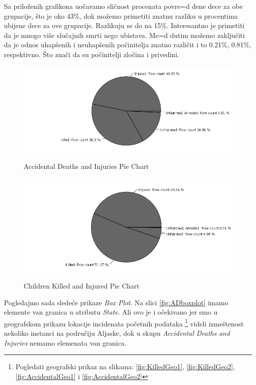 \documentclass[12pt, a4paper]{article}
\def\dj{\leavevmode\setbox0=\hbox{d}\kern0pt
\rlap{\kern.215em\raise.46\ht0\hbox{-}}d}
\begin{document}
\newpage
Sa prilo\v zenih grafikona uo\v cavamo sli\v cnost procenata povre\dj ene dece za obe grupacije, \v sto je oko 43\%, dok mo\v zemo primetiti znatnu razliku u procentima ubijene dece za ove grupacije. Razlikuju se do na 15\%. Interesantno je primetiti da je mnogo vi\v se slu\v cajnih smrti nego ubistava.
Me\dj utim mo\v zemo zaklju\v citi da je odnos uhap\v senih i neuhap\v senih po\v cinitelja znatno razli\v cit i to 0.21\%, 0.81\%, respektivno. \v Sto zna\v ci da su po\v cinitelji zlo\v cina i privedini.
\begin{figure}[H]
\centering
  \begin{minipage}[b]{0.45\textwidth}
    \includegraphics[width=\textwidth]{visualisation_PieChart_accidentalDI.png}
    \caption{Accidental Deaths and Injuries Pie Chart}
  \end{minipage}
  \hfill
  \begin{minipage}[b]{0.45\textwidth}
    \includegraphics[width=\textwidth]{visualisation_PieChart_childrenKI.png}
    \caption{Children Killed and Injured Pie Chart}
  \end{minipage}
\end{figure}

Pogledajmo sada slede\' ce prikaze \textit{Box Plot}. Na slici \ref{fig:ADboxplot} imamo elemente van granica u atributu \textit{State}. Ali ovo je i o\v cekivano jer smo u geografskom prikazu lokacije incidenata po\v cetnih podataka \footnote{Pogledati geografski prikaz na slikama: \ref{fig:KilledGeo1}, \ref{fig:KilledGeo2}, \ref{fig:AccidentalGeo1} i \ref{fig:AccidentalGeo2}}
videli izme\v stenost nekoliko instanci na podru\v ciju Aljaske, dok u skupu \textit{Accidental Deaths and Injuries} nemamo elemenata van granica. 
\end{document}
